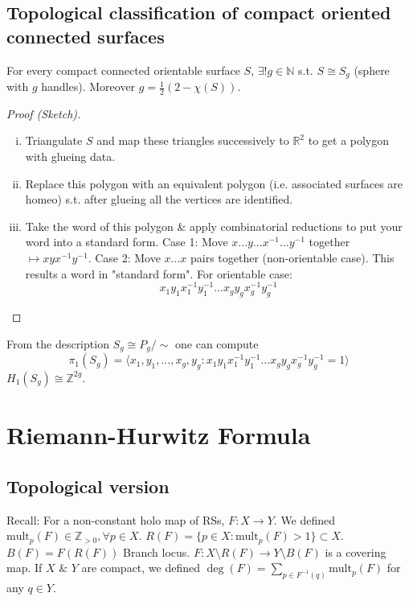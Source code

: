 \documentclass{article}
\begin{document}
\subsection{Topological classification of compact oriented connected surfaces}

\begin{theorem}
    For every compact connected orientable surface $S$, $\exists ! g \in \mathbb{N}$ s.t. $S \cong S_g$ (sphere with $g$ handles).
    Moreover $g = \frac{1}{2}(2 - \chi(S))$.
\end{theorem}
\begin{proof}[Proof (Sketch)]
    \begin{enumerate}[(i)]
        \item Triangulate $S$ and map these triangles successively to $\mathbb{R}^2$ to get a polygon with glueing data.
        \item Replace this polygon with an equivalent polygon (i.e. associated surfaces are homeo) s.t. after glueing all the vertices are identified.
        \item Take the word of this polygon \& apply combinatorial reductions to put your word into a standard form.
        Case 1: Move $x...y...x^{-1}...y^{-1}$ together $\mapsto xyx^{-1}y^{-1}$.
        Case 2: Move $x...x$ pairs together (non-orientable case).
        This results a word in "standard form".
        For orientable case:
        \[
        x_1 y_1 x_1^{-1} y_1^{-1} ... x_g y_g x_g^{-1} y_g^{-1}
        \]
    \end{enumerate}
\end{proof}

\begin{remark}
    From the description $S_g \cong P_g / \sim$ one can compute
    \[
    \pi_1(S_g) = \langle x_1, y_1, ..., x_g, y_g : x_1 y_1 x_1^{-1} y_1^{-1} ... x_g y_g x_g^{-1} y_g^{-1} = 1 \rangle
    \]
    $H_1(S_g) \cong \mathbb{Z}^{2g}$.
\end{remark}

\newpage
\section{Riemann-Hurwitz Formula}

\subsection{Topological version}

Recall: For a non-constant holo map of RSs, $F: X \to Y$.
We defined $\text{mult}_p(F) \in \mathbb{Z}_{>0}, \forall p \in X$.
$R(F) = \{ p \in X : \text{mult}_p(F) > 1 \} \subset X$.
$B(F) = F(R(F))$ Branch locus.
$F: X \setminus R(F) \to Y \setminus B(F)$ is a covering map.
If $X$ \& $Y$ are compact, we defined $\deg(F) = \sum_{p \in F^{-1}(q)} \text{mult}_p(F)$ for any $q \in Y$.
\end{document}
